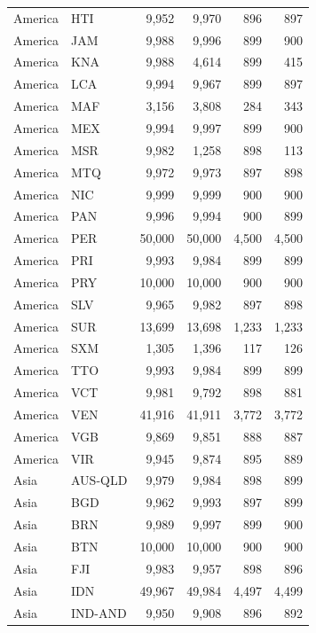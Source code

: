 \documentclass[12pt,]{article}
\begin{document}
\begin{longtable}[t]{llrrrr}
America & HTI & 9,952 & 9,970 & 896 & 897\\
\rowcolor{gray!6}  America & JAM & 9,988 & 9,996 & 899 & 900\\
America & KNA & 9,988 & 4,614 & 899 & 415\\
\rowcolor{gray!6}  America & LCA & 9,994 & 9,967 & 899 & 897\\
America & MAF & 3,156 & 3,808 & 284 & 343\\
\rowcolor{gray!6}  America & MEX & 9,994 & 9,997 & 899 & 900\\
America & MSR & 9,982 & 1,258 & 898 & 113\\
\rowcolor{gray!6}  America & MTQ & 9,972 & 9,973 & 897 & 898\\
America & NIC & 9,999 & 9,999 & 900 & 900\\
\rowcolor{gray!6}  America & PAN & 9,996 & 9,994 & 900 & 899\\
America & PER & 50,000 & 50,000 & 4,500 & 4,500\\
\rowcolor{gray!6}  America & PRI & 9,993 & 9,984 & 899 & 899\\
America & PRY & 10,000 & 10,000 & 900 & 900\\
\rowcolor{gray!6}  America & SLV & 9,965 & 9,982 & 897 & 898\\
America & SUR & 13,699 & 13,698 & 1,233 & 1,233\\
\rowcolor{gray!6}  America & SXM & 1,305 & 1,396 & 117 & 126\\
America & TTO & 9,993 & 9,984 & 899 & 899\\
\rowcolor{gray!6}  America & VCT & 9,981 & 9,792 & 898 & 881\\
America & VEN & 41,916 & 41,911 & 3,772 & 3,772\\
\rowcolor{gray!6}  America & VGB & 9,869 & 9,851 & 888 & 887\\
America & VIR & 9,945 & 9,874 & 895 & 889\\
\rowcolor{gray!6}  Asia & AUS-QLD & 9,979 & 9,984 & 898 & 899\\
Asia & BGD & 9,962 & 9,993 & 897 & 899\\
\rowcolor{gray!6}  Asia & BRN & 9,989 & 9,997 & 899 & 900\\
Asia & BTN & 10,000 & 10,000 & 900 & 900\\
\rowcolor{gray!6}  Asia & FJI & 9,983 & 9,957 & 898 & 896\\
Asia & IDN & 49,967 & 49,984 & 4,497 & 4,499\\
\rowcolor{gray!6}  Asia & IND-AND & 9,950 & 9,908 & 896 & 892\\

\end{longtable}
\end{document}
